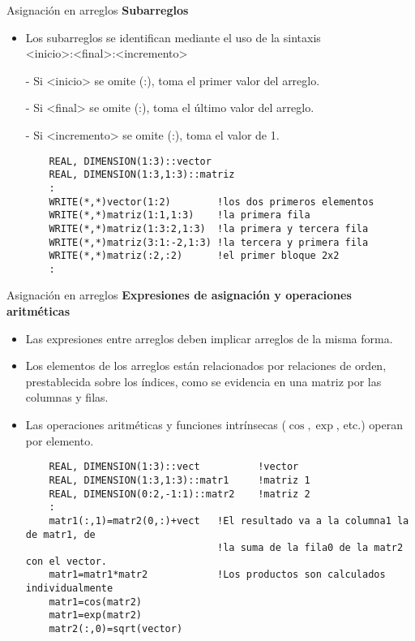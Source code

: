 \begin{frame}[fragile]{Asignación en arreglos}
 \textbf{Subarreglos}
  \begin{itemize}[<+(1)->]
  \item Los subarreglos se identifican mediante el uso de la sintaxis \\ 
   \centering <inicio>:<final>:<incremento>
  \item [-] Si <inicio> se omite (:), toma el primer valor del arreglo. 
  \item [-] Si <final> se omite (:), toma el último valor del arreglo.
  \item [-] Si <incremento> se omite (:), toma el valor de 1.
  \vspace{0.15cm}
  \item[]
  \begin{verbatim}
    REAL, DIMENSION(1:3)::vector
    REAL, DIMENSION(1:3,1:3)::matriz
    :
    WRITE(*,*)vector(1:2)        !los dos primeros elementos
    WRITE(*,*)matriz(1:1,1:3)    !la primera fila
    WRITE(*,*)matriz(1:3:2,1:3)  !la primera y tercera fila
    WRITE(*,*)matriz(3:1:-2,1:3) !la tercera y primera fila
    WRITE(*,*)matriz(:2,:2)      !el primer bloque 2x2
    :
  \end{verbatim}
 \end{itemize}
\end{frame}


\begin{frame}[fragile]{Asignación en arreglos}
 \textbf{Expresiones de asignación y operaciones aritméticas}
  \begin{itemize}[<+(1)->]
  \item Las expresiones entre arreglos  deben implicar arreglos de la misma forma.
  \item Los elementos de los arreglos están relacionados por relaciones de orden, prestablecida sobre los índices, como se evidencia en una matriz por las columnas y filas.
  \item Las operaciones aritméticas y funciones intrínsecas ($\cos, \exp$, etc.) operan por elemento. 
  \begin{verbatim}
    REAL, DIMENSION(1:3)::vect          !vector
    REAL, DIMENSION(1:3,1:3)::matr1     !matriz 1
    REAL, DIMENSION(0:2,-1:1)::matr2    !matriz 2
    :
    matr1(:,1)=matr2(0,:)+vect   !El resultado va a la columna1 la de matr1, de 
                                 !la suma de la fila0 de la matr2 con el vector.
    matr1=matr1*matr2            !Los productos son calculados individualmente
    matr1=cos(matr2)
    matr1=exp(matr2)
    matr2(:,0)=sqrt(vector)
  \end{verbatim}
 \end{itemize}
\end{frame}


